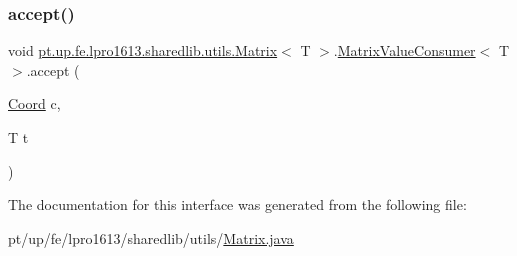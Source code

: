 \subsubsection{\texorpdfstring{accept()}{accept()}}
{\footnotesize\ttfamily void \hyperlink{classpt_1_1up_1_1fe_1_1lpro1613_1_1sharedlib_1_1utils_1_1_matrix}{pt.\+up.\+fe.\+lpro1613.\+sharedlib.\+utils.\+Matrix}$<$ T $>$.\hyperlink{interfacept_1_1up_1_1fe_1_1lpro1613_1_1sharedlib_1_1utils_1_1_matrix_1_1_matrix_value_consumer}{Matrix\+Value\+Consumer}$<$ T $>$.accept (\begin{DoxyParamCaption}\item[{\hyperlink{classpt_1_1up_1_1fe_1_1lpro1613_1_1sharedlib_1_1utils_1_1_coord}{Coord}}]{c,  }\item[{T}]{t }\end{DoxyParamCaption})}



The documentation for this interface was generated from the following file\+:\begin{DoxyCompactItemize}
\item 
pt/up/fe/lpro1613/sharedlib/utils/\hyperlink{_matrix_8java}{Matrix.\+java}\end{DoxyCompactItemize}
